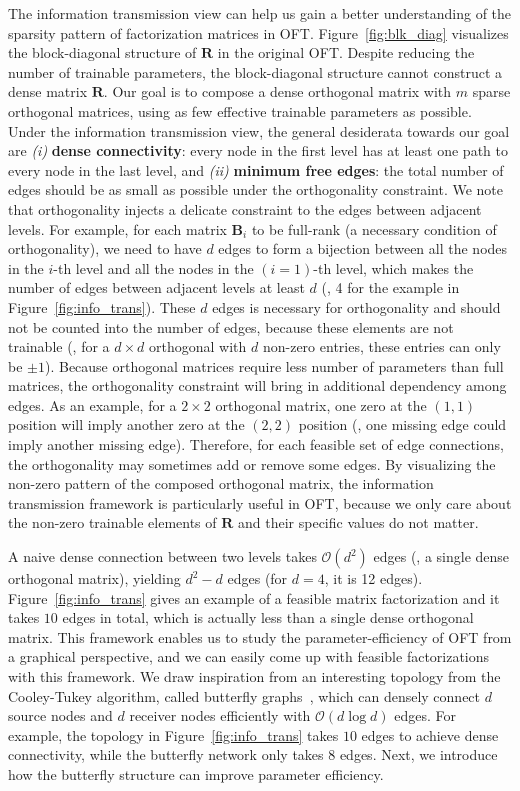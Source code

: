 The information transmission view can help us gain a better understanding of the sparsity pattern of factorization matrices in OFT. Figure~\ref{fig:blk_diag} visualizes the block-diagonal structure of $\bm{R}$ in the original OFT. Despite reducing the number of trainable parameters, the block-diagonal structure cannot construct a dense matrix $\bm{R}$. Our goal is to compose a dense orthogonal matrix with $m$ sparse orthogonal matrices, using as few effective trainable parameters as possible. Under the information transmission view, the general desiderata towards our goal are \emph{(i)} \textbf{dense connectivity}: every node in the first level has at least one path to every node in the last level, and \emph{(ii)} \textbf{minimum free edges}: the total number of edges should be as small as possible under the orthogonality constraint. We note that orthogonality injects a delicate constraint to the edges between adjacent levels. For example, for each matrix $\bm{B}_i$ to be full-rank (a necessary condition of orthogonality), we need to have $d$ edges to form a bijection between all the nodes in the $i$-th level and all the nodes in the $(i=1)$-th level, which makes the number of edges between adjacent levels at least $d$ (\eg, 4 for the example in Figure~\ref{fig:info_trans}). These $d$ edges is necessary for orthogonality and should not be counted into the number of edges, because these elements are not trainable (\eg, for a $d\times d$ orthogonal with $d$ non-zero entries, these entries can only be $\pm 1$). Because orthogonal matrices require less number of parameters than full matrices, the orthogonality constraint will bring in additional dependency among edges. As an example, for a $2\times 2$ orthogonal matrix, one zero at the $(1,1)$ position will imply another zero at the $(2,2)$ position (\ie, one missing edge could imply another missing edge). Therefore, for each feasible set of edge connections, the orthogonality may sometimes add or remove some edges. By visualizing the non-zero pattern of the composed orthogonal matrix, the information transmission framework is particularly useful in OFT, because we only care about the non-zero trainable elements of $\bm{R}$ and their specific values do not matter.


A naive dense connection between two levels takes $\mathcal{O}(d^2)$ edges (\ie, a single dense orthogonal matrix), yielding $d^2-d$ edges (for $d=4$, it is 12 edges). Figure~\ref{fig:info_trans} gives an example of a feasible matrix factorization and it takes $10$ edges in total, which is actually less than a single dense orthogonal matrix. This framework enables us to study the parameter-efficiency of OFT from a graphical perspective, and we can easily come up with feasible factorizations with this framework. We draw inspiration from an interesting topology from the Cooley-Tukey algorithm, called butterfly graphs~\cite{cooley1965algorithm}, which can densely connect $d$ source nodes and $d$ receiver nodes efficiently with $\mathcal{O}(d\log d)$ edges. For example, the topology in Figure~\ref{fig:info_trans} takes $10$ edges to achieve dense connectivity, while the butterfly network only takes $8$ edges. Next, we introduce how the butterfly structure can improve parameter efficiency.
 

